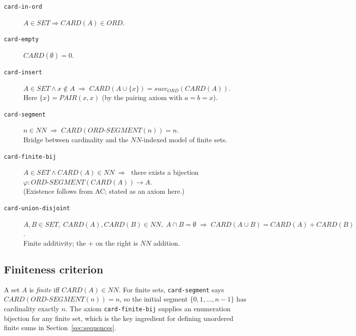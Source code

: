 \begin{description}
\item[\texttt{card-in-ord}]
  $A \in \mathit{SET} \Rightarrow \mathit{CARD}(A) \in \mathit{ORD}$.

\item[\texttt{card-empty}]
  $\mathit{CARD}(\emptyset) = 0$.

\item[\texttt{card-insert}]
  $A \in \mathit{SET} \wedge x \notin A \;\Rightarrow\;
   \mathit{CARD}(A \cup \{x\}) = \mathit{succ_{ORD}}(\mathit{CARD}(A))$.\\
  Here $\{x\} = \mathit{PAIR}(x,x)$ (by the pairing axiom with $a = b = x$).

\item[\texttt{card-segment}]
  $n \in \mathit{NN} \;\Rightarrow\; \mathit{CARD}(\mathit{ORD\text{-}SEGMENT}(n)) = n$.\\
  Bridge between cardinality and the $\mathit{NN}$-indexed model of finite sets.

\item[\texttt{card-finite-bij}]
  $A \in \mathit{SET} \wedge \mathit{CARD}(A) \in \mathit{NN} \;\Rightarrow\;$
  there exists a bijection
  $\varphi : \mathit{ORD\text{-}SEGMENT}(\mathit{CARD}(A)) \to A$.\\
  (Existence follows from AC; stated as an axiom here.)

\item[\texttt{card-union-disjoint}]
  $A, B \in \mathit{SET},\;
   \mathit{CARD}(A), \mathit{CARD}(B) \in \mathit{NN},\;
   A \cap B = \emptyset \;\Rightarrow\;
   \mathit{CARD}(A \cup B) = \mathit{CARD}(A) + \mathit{CARD}(B)$.\\
  Finite additivity; the $+$ on the right is $\mathit{NN}$ addition.
\end{description}

\subsection*{Finiteness criterion}

A set $A$ is \emph{finite} iff $\mathit{CARD}(A) \in \mathit{NN}$.
For finite sets, \texttt{card-segment} says
$\mathit{CARD}(\mathit{ORD\text{-}SEGMENT}(n)) = n$, so the initial
segment $\{0, 1, \ldots, n-1\}$ has cardinality exactly $n$.  The
axiom \texttt{card-finite-bij} supplies an enumeration bijection for
any finite set, which is the key ingredient for defining unordered
finite sums in Section~\ref{sec:sequences}.

